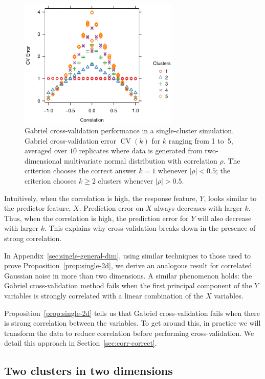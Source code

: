 \documentclass[12pt]{article}
\newcommand{\CV}{\operatorname{CV}}
\begin{document}
\begin{figure}
\centering
\includegraphics[width=3in]{main_code/demo/nullcorr/equal.pdf}
\caption{Gabriel cross-validation performance in a single-cluster simulation.
    Gabriel cross-validation error $\CV(k)$ for $k$ ranging from 1 to~5,
    averaged over $10$ replicates where
    data is generated from two-dimensional
multivariate normal distribution with correlation $\rho$.  The 
    criterion chooses the correct answer $k = 1$ whenever
$|\rho| < 0.5$; the criterion chooses $k \geq 2$ clusters whenever $|\rho| > 0.5$.}
\label{fig:nullcorr-equal}
\end{figure}


Intuitively, when the correlation is high, the response feature, $Y$, looks
similar to the predictor feature, $X$. Prediction error on $X$ always
decreases with larger $k$. Thus, when the correlation is high, the prediction
error for $Y$ will also decrease with larger $k$. This explains why
cross-validation breaks down in the presence of strong correlation.


In Appendix~\ref{sec:single-general-dim}, using similar techniques to those used
to prove Proposition~\ref{prop:single-2d}, we derive an analogous result for correlated
Gaussian noise in more than two dimensions. A similar phenomenon holds:
the Gabriel cross-validation method fails when the first principal component
of the $Y$ variables is strongly correlated with a linear combination of the
$X$ variables.


Proposition~\ref{prop:single-2d} tells us that Gabriel cross-validation fails
when there is strong correlation between the variables. To get around this, in
practice we will transform the data to reduce correlation before performing
cross-validation. We detail this approach in Section~\ref{sec:corr-correct}.


\subsection{Two clusters in two dimensions}
\end{document}
